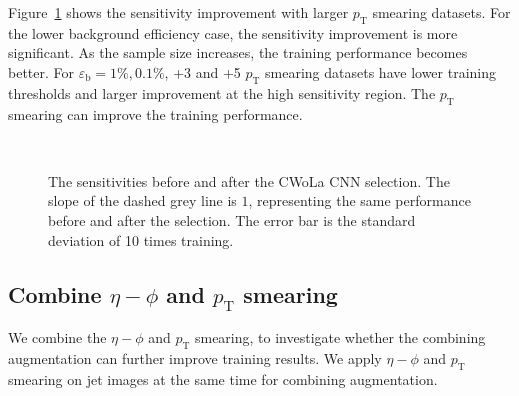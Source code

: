\documentclass[12pt]{article}
\begin{document}
        Figure~\ref{fig:sensitivity_improvement_origin_pt_aug_1_3_5} shows the sensitivity improvement with larger $p_{\text{T}}$ smearing datasets. For the lower background efficiency case, the sensitivity improvement is more significant. As the sample size increases, the training performance becomes better. For $\varepsilon_{\text{b}} = 1 \%, 0.1 \%$, +3 and +5 $p_{\text{T}}$ smearing datasets have lower training thresholds and larger improvement at the high sensitivity region. The $p_{\text{T}}$ smearing can improve the training performance.
        \begin{figure}[htpb]
            \centering
             \\
            \caption{The sensitivities before and after the CWoLa CNN selection. The slope of the dashed grey line is $1$, representing the same performance before and after the selection. The error bar is the standard deviation of 10 times training.}
            \label{fig:sensitivity_improvement_origin_pt_aug_1_3_5}
        \end{figure}
    \subsection{Combine \texorpdfstring{$\eta-\phi$}{eta-phi} and \texorpdfstring{$p_{\mathrm{T}}$}{pT} smearing}%
    \label{sub:combine_eta_phi_and_pt_smearing}
        We combine the $\eta-\phi$ and $p_{\text{T}}$ smearing, to investigate whether the combining augmentation can further improve training results. We apply $\eta-\phi$ and $p_{\text{T}}$ smearing on jet images at the same time for combining augmentation.
\end{document}
